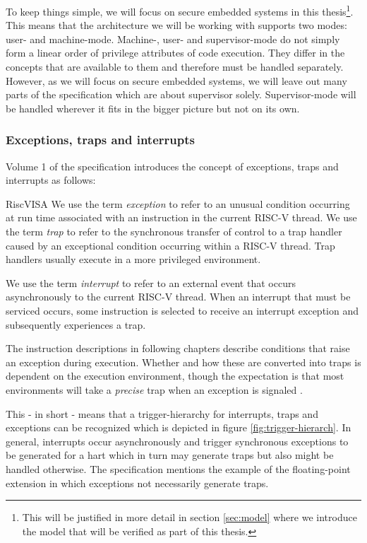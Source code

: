 To keep things simple, we will focus on secure embedded systems in this thesis\footnote{%
    This will be justified in more detail in section \ref{sec:model} where we introduce the model that will be verified as part of this thesis.
}.
This means that the architecture we will be working with supports two modes: user- and machine-mode.
Machine-, user- and supervisor-mode do not simply form a linear order of privilege attributes of code execution.
They differ in the concepts that are available to them and therefore must be handled separately.
However, as we will focus on secure embedded systems, we will leave out many parts of the specification which are about supervisor solely.
Supervisor-mode will be handled wherever it fits in the bigger picture but not on its own.

\subsubsection{Exceptions, traps and interrupts}

Volume 1 of the specification introduces the concept of exceptions, traps and interrupts as follows:
\begin{displaycquote}{RiscVISA}
    We use the term \textit{exception} to refer to an unusual condition occurring at run time associated with an instruction in the current RISC-V thread.
    We use the term \textit{trap} to refer to the synchronous transfer of control to a trap handler caused by an exceptional condition occurring within a RISC-V thread.
    Trap handlers usually execute in a more privileged environment.

    We use the term \textit{interrupt} to refer to an external event that occurs asynchronously to the current RISC-V thread.
    When an interrupt that must be serviced occurs, some instruction is selected to receive an interrupt exception and subsequently experiences a trap.

    The instruction descriptions in following chapters describe conditions that raise an exception during execution.
    Whether and how these are converted into traps is dependent on the execution environment, though the expectation is that most environments will take a \textit{precise} trap when an exception is signaled \textelp{}.
\end{displaycquote}

This - in short - means that a trigger-hierarchy for interrupts, traps and exceptions can be recognized which is depicted in figure \ref{fig:trigger-hierarch}.
In general, interrupts occur asynchronously and trigger synchronous exceptions to be generated for a \gls{hart} which in turn may generate traps but also might be handled otherwise.
The specification mentions the example of the floating-point extension in which exceptions not necessarily generate traps.

